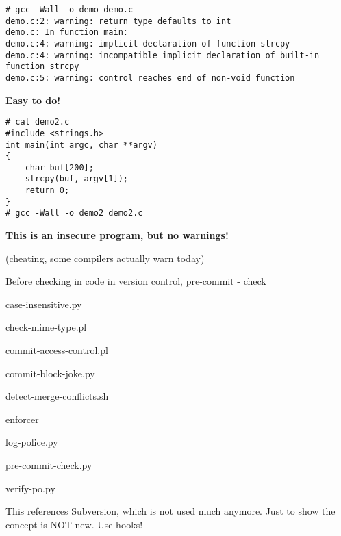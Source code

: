\documentclass[Screen16to9,17pt]{foils}
\begin{document}
\begin{verbatim}
# gcc -Wall -o demo demo.c
demo.c:2: warning: return type defaults to int
demo.c: In function main:
demo.c:4: warning: implicit declaration of function strcpy
demo.c:4: warning: incompatible implicit declaration of built-in
function strcpy
demo.c:5: warning: control reaches end of non-void function
\end{verbatim}

\vskip 15mm
\centerline{\bf\LARGE\color{security6blue}Easy to do!}


\begin{verbatim}
# cat demo2.c
#include <strings.h>
int main(int argc, char **argv)
{
    char buf[200];
    strcpy(buf, argv[1]);
    return 0;
}
# gcc -Wall -o demo2 demo2.c
\end{verbatim}

\vskip 1cm
\centerline{\bf\large\color{security6blue}This is an insecure program, but no warnings!}

(cheating, some compilers actually warn today)


\begin{list1}
\item Before checking in code in version control,  pre-commit - check
\begin{list2}
\item case-insensitive.py
\item check-mime-type.pl
\item commit-access-control.pl
\item commit-block-joke.py
\item detect-merge-conflicts.sh
\item enforcer
\item log-police.py
\item pre-commit-check.py
\item verify-po.py
\end{list2}
\item {}
\item {}
\end{list1}

This references Subversion, which is not used much anymore. Just to show the concept is NOT new. Use hooks!
\end{document}

